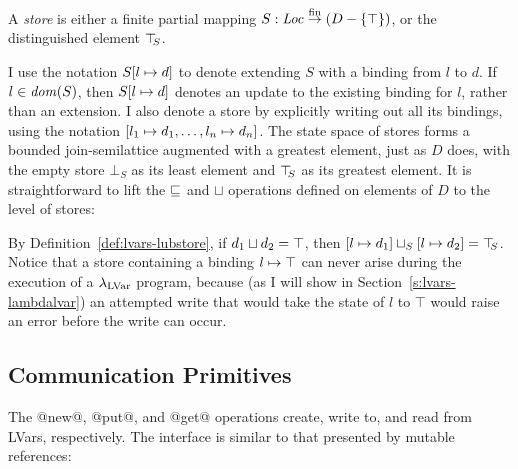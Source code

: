 \begin{definition}\label{def:lvars-store}
A \emph{store} is either a finite partial mapping $S : \mathit{Loc} \stackrel{\textrm{fin}}{\rightarrow}
(D-\lbrace \top \rbrace)$, or the distinguished element $\top\hspace{-0.85mm}_{S}$.
\end{definition}

I use the notation $S[l \mapsto d]$ to denote extending $S$ with a
binding from $l$ to $d$.  If $l \in \mathit{dom}(S)$, then $S[l \mapsto d]$
denotes an update to the existing binding for $l$, rather than an
extension.  I also denote a store by explicitly writing out all its
bindings, using the notation $\left[ l_1 \mapsto d_1,
  \dots, l_n \mapsto d_n \right]$.  The state space of stores
forms a bounded join-semilattice augmented with a greatest element,
just as $D$ does, with the empty store $\bot_S$ as its least element
and $\top\hspace{-0.85mm}_{S}$ as its greatest element.  It is straightforward to lift
the $\sqsubseteq$ and $\sqcup$ operations defined on elements of $D$ to
the level of stores:

\LVarsDefLeqStore

\LVarsDefLubStore

By Definition~\ref{def:lvars-lubstore}, if $d_1 \sqcup d_2 =
\top$, then
$\left[ l \mapsto d_1 \right] \sqcup_{S} \left[ l \mapsto d_2 \right]
= \top\hspace{-0.85mm}_{S}$.  Notice that a store containing a binding
$l \mapsto \top$ can never arise during the execution of a
$\lambda_{\textrm{LVar}}$ program, because (as I will show in
Section~\ref{s:lvars-lambdalvar}) an attempted write that would take
the state of $l$ to $\top$ would raise an error before the write can
occur.

\subsection{Communication Primitives}\label{subsection:lvars-communication-primitives}

The @new@, @put@, and @get@ operations create, write to, and read
from LVars, respectively. The interface is similar to that presented
by mutable references:

